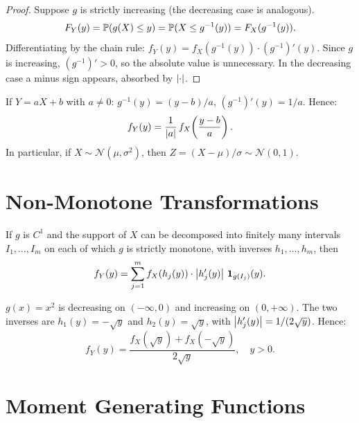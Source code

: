 \begin{proof}
Suppose $g$ is strictly increasing (the decreasing case is analogous).
\[
    F_Y(y) = \mathbb{P}(g(X) \leq y) = \mathbb{P}(X \leq g^{-1}(y)) = F_X(g^{-1}(y)).
\]
Differentiating by the chain rule:
$f_Y(y) = f_X(g^{-1}(y))\cdot (g^{-1})'(y)$.
Since $g$ is increasing, $(g^{-1})' > 0$, so the absolute value is unnecessary.
In the decreasing case a minus sign appears, absorbed by $\left| \cdot \right|$.
\end{proof}

\begin{example}
If $Y = aX + b$ with $a \neq 0$:
$g^{-1}(y) = (y-b)/a$, $(g^{-1})'(y) = 1/a$. Hence:
\[
    f_Y(y) = \frac{1}{\left| a \right|}\,f_X\!\left(\frac{y-b}{a}\right).
\]
In particular, if $X \sim \mathcal{N}(\mu, \sigma^2)$, then
$Z = (X-\mu)/\sigma \sim \mathcal{N}(0,1)$.
\end{example}

\section{Non-Monotone Transformations}

\begin{theorem}
If $g$ is $C^1$ and the support of $X$ can be decomposed into finitely many
intervals $I_1, \ldots, I_m$ on each of which $g$ is strictly monotone, with
inverses $h_1, \ldots, h_m$, then
\[
    f_Y(y) = \sum_{j=1}^{m} f_X(h_j(y))\cdot\left| h_j'(y) \right|\,\mathbf{1}_{g(I_j)}(y).
\]
\end{theorem}

\begin{example}[$Y = X^2$ with symmetric $f_X$]
$g(x) = x^2$ is decreasing on $(-\infty, 0)$ and increasing on $(0, +\infty)$.
The two inverses are $h_1(y) = -\sqrt{y}$ and $h_2(y) = \sqrt{y}$, with
$\left| h_j'(y) \right| = 1/(2\sqrt{y})$. Hence:
\[
    f_Y(y) = \frac{f_X(\sqrt{y}) + f_X(-\sqrt{y})}{2\sqrt{y}}, \quad y > 0.
\]
\end{example}

\section{Moment Generating Functions}

